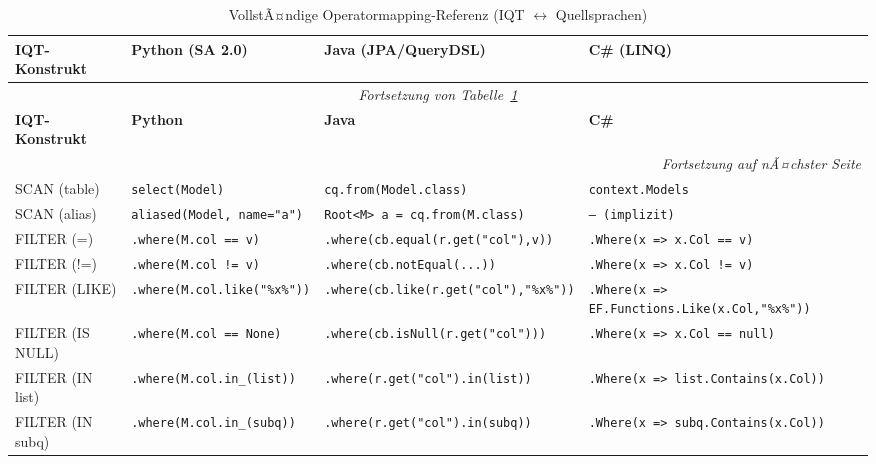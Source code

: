 \begin{landscape}
\scriptsize
\begin{longtable}{p{4.5cm}p{5.5cm}p{5.5cm}p{5.5cm}}
\caption{VollstÃ¤ndige Operatormapping-Referenz (IQT $\leftrightarrow$ Quellsprachen)}
\label{tab:full_mapping} \\
\toprule
\textbf{IQT-Konstrukt} & \textbf{Python (SA 2.0)} & \textbf{Java (JPA/QueryDSL)} & \textbf{C\# (LINQ)} \\
\midrule
\endfirsthead
\multicolumn{4}{c}{\small\itshape Fortsetzung von Tabelle~\ref{tab:full_mapping}} \\
\toprule
\textbf{IQT-Konstrukt} & \textbf{Python} & \textbf{Java} & \textbf{C\#} \\
\midrule
\endhead
\midrule
\multicolumn{4}{r}{\small\itshape Fortsetzung auf nÃ¤chster Seite} \\
\endfoot
\bottomrule
\endlastfoot

SCAN (table)
  & \texttt{select(Model)}
  & \texttt{cq.from(Model.class)}
  & \texttt{context.Models} \\[4pt]

SCAN (alias)
  & \texttt{aliased(Model, name="a")}
  & \texttt{Root<M> a = cq.from(M.class)}
  & \texttt{-- (implizit)} \\[4pt]

FILTER (=)
  & \texttt{.where(M.col == v)}
  & \texttt{.where(cb.equal(r.get("col"),v))}
  & \texttt{.Where(x => x.Col == v)} \\[4pt]

FILTER (!=)
  & \texttt{.where(M.col != v)}
  & \texttt{.where(cb.notEqual(...))}
  & \texttt{.Where(x => x.Col != v)} \\[4pt]

FILTER (LIKE)
  & \texttt{.where(M.col.like("\%x\%"))}
  & \texttt{.where(cb.like(r.get("col"),"\%x\%"))}
  & \texttt{.Where(x => EF.Functions.Like(x.Col,"\%x\%"))} \\[4pt]

FILTER (IS NULL)
  & \texttt{.where(M.col == None)}
  & \texttt{.where(cb.isNull(r.get("col")))}
  & \texttt{.Where(x => x.Col == null)} \\[4pt]

FILTER (IN list)
  & \texttt{.where(M.col.in\_(list))}
  & \texttt{.where(r.get("col").in(list))}
  & \texttt{.Where(x => list.Contains(x.Col))} \\[4pt]

FILTER (IN subq)
  & \texttt{.where(M.col.in\_(subq))}
  & \texttt{.where(r.get("col").in(subq))}
  & \texttt{.Where(x => subq.Contains(x.Col))} \\[4pt]


\end{longtable}
\end{landscape}
